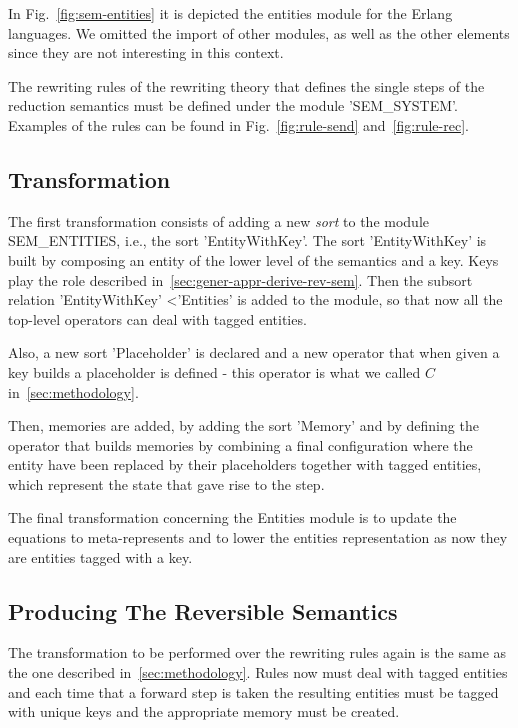 \documentclass{article}[12pt,a4paper]
\theoremstyle{definition}
\begin{document}
In Fig.~\ref{fig:sem-entities} it is depicted the entities module for the Erlang
languages. We omitted the import of other modules, as well as the other elements
since they are not interesting in this context.

The rewriting rules of the rewriting theory that defines the
single steps of the reduction semantics must be defined under the module
'SEM_SYSTEM'. Examples of the rules can be found in Fig.~\ref{fig:rule-send} and~\ref{fig:rule-rec}.

\subsection{Transformation}

The first transformation consists of adding a new \emph{sort} to the module
SEM_ENTITIES,
i.e., the sort 'EntityWithKey'. The sort 'EntityWithKey' is built by composing
an entity of the lower level of the semantics and a key. Keys play the role
described in~\ref{sec:gener-appr-derive-rev-sem}. Then the subsort relation 'EntityWithKey'
\textless 'Entities' is added to the module, so that now all the top-level operators can
deal with tagged entities. 

Also, a new sort 'Placeholder' is declared and a new operator that when given a key
builds a placeholder is defined - this operator is what we called $C$ in~\ref{sec:methodology}.

Then, memories are added, by adding the sort 'Memory' and by defining the
operator that builds memories by combining a final configuration where the
entity have been replaced by their placeholders together with tagged entities,
which represent the state that gave rise to the step.

The final transformation concerning the Entities module is to update the
equations to meta-represents and to lower the entities representation as now they are entities tagged with a key.


\subsection{Producing The Reversible Semantics}

The transformation to be performed over the rewriting rules again is the same as the
one described in~\ref{sec:methodology}. Rules now must deal with tagged entities and
each time that a forward step is taken the resulting entities must be tagged
with unique keys and the appropriate memory must be created.
\end{document}

